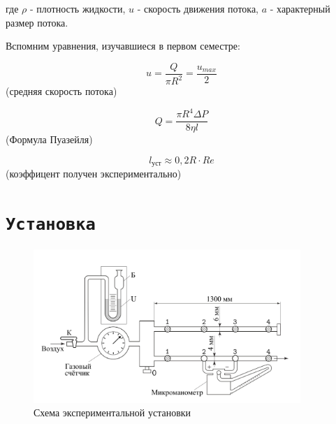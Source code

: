 \documentclass[11pt,a4paper]{article}
\begin{document}
где $\rho$ - плотность жидкости, $u$ - скорость движения потока, $a$ - характерный размер потока.

Вспомним уравнения, изучавшиеся в первом семестре:


$$u = \frac{Q}{\pi R^{2}} = \frac{u_{max}}{2}$$ (средняя скорость потока)

$$Q = \frac{\pi R^{4} \Delta P}{8\eta l}$$ (Формула Пуазейля)

$$l_{\text{уст}} \approx 0,2R\cdot Re$$ (коэффицент получен экспериментально)
\newpage

\section*{\texttt{Установка}}

\begin{figure}[h!]
	\begin{center}
		\includegraphics[width = 0.9\textwidth]{ust}
		\caption{Схема экспериментальной установки}
		\label{fig:facility}
	\end{center}
\end{figure}
\end{document}
